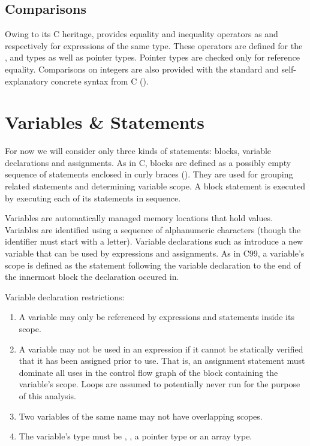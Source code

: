 \subsection{Comparisons}

Owing to its C heritage, \langname{} provides equality and inequality operators
as \langtext{==} and \langtext{!=} respectively for expressions of the same
type. These operators are defined for the ,  and
 types as well as pointer types. Pointer types are checked only
for reference equality.  Comparisons on integers are also provided with the
standard and self-explanatory concrete syntax from C (\langtext{< <= > >=}).

\section{Variables \& Statements}

For now we will consider only three kinds of statements: blocks, variable
declarations and assignments. As in C, blocks are defined as a possibly empty
sequence of statements enclosed in curly braces (\langtext{\{ \}}). They are
used for grouping related statements and determining variable scope. A block
statement is executed by executing each of its statements in sequence.

\grammarbegin
\grmcompoundstatement
\grammarend

Variables are automatically managed memory locations that hold values.
Variables are identified using a sequence of alphanumeric characters (though
the identifier must start with a letter). Variable declarations such as
 introduce a new variable that can be used by expressions and
assignments. As in C99, a variable's scope is defined as the statement
following the variable declaration to the end of the innermost block the
declaration occured in.

\grammarbegin
\grmdeclstatement
\grammarend

Variable declaration restrictions:
\begin{enumerate}

\item A variable may only be referenced by expressions and statements inside
its scope.

\item A variable may not be used in an expression if it cannot be statically
verified that it has been assigned prior to use.  That is, an assignment
statement must dominate all uses in the control flow graph of the block
containing the variable's scope. Loops are assumed to potentially never run for
the purpose of this analysis.

\item Two variables of the same name may not have overlapping scopes.

\item The variable's type must be , , a pointer
type or an array type.

\end{enumerate}


